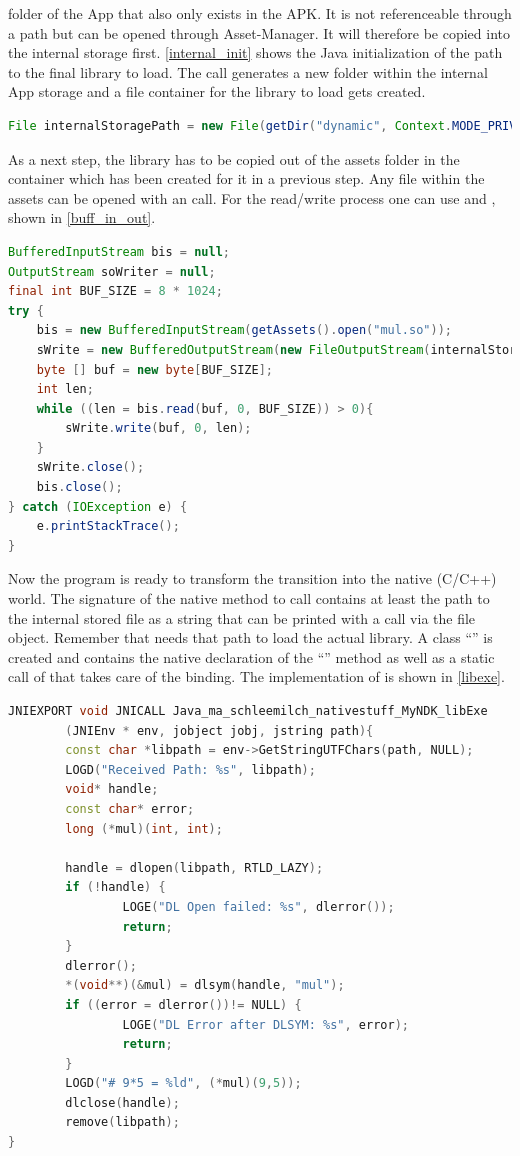  folder of the App that also only exists in the APK. It is not
referenceable through a path but can be opened through Asset-Manager. It will therefore be copied into the internal storage first. \autoref{internal_init} shows the Java initialization of the path to the final library to load. The  call generates a new folder within the internal App storage and a file container for the library to load gets created.
\begin{lstlisting}[language=Java, caption=Internal Storage Initialization, label=internal_init]
File internalStoragePath = new File(getDir("dynamic", Context.MODE_PRIVATE), "mul.so");
\end{lstlisting}
As a next step, the library has to be copied out of the assets folder in the container which has been created for it in a previous step. Any file within the assets can be opened with an
 call. For the read/write process one can use
 and , shown in
\autoref{buff_in_out}.
\begin{lstlisting}[language=Java, caption=Buffered Input/Output, label=buff_in_out]
BufferedInputStream bis = null;
OutputStream soWriter = null;
final int BUF_SIZE = 8 * 1024;
try {
    bis = new BufferedInputStream(getAssets().open("mul.so"));
    sWrite = new BufferedOutputStream(new FileOutputStream(internalStoragePath));
    byte [] buf = new byte[BUF_SIZE];
    int len;
    while ((len = bis.read(buf, 0, BUF_SIZE)) > 0){
        sWrite.write(buf, 0, len);
    }
    sWrite.close();
    bis.close();
} catch (IOException e) {
    e.printStackTrace();
}
\end{lstlisting}
Now the program is ready to transform the transition into the native (C/C++) world.
The signature of the native method to call contains at least the path to
the internal stored file as a string that can be printed with a  call via the
 file object. Remember that  needs that path to load the actual library.
A class ``'' is created and contains the native declaration of the
``'' method as well as a static call of
 that takes care of the binding.
The implementation of  is shown in \autoref{libexe}.
\begin{lstlisting}[language=C++, caption=Native libExe(), label=libexe]
JNIEXPORT void JNICALL Java_ma_schleemilch_nativestuff_MyNDK_libExe
        (JNIEnv * env, jobject jobj, jstring path){
        const char *libpath = env->GetStringUTFChars(path, NULL);
        LOGD("Received Path: %s", libpath);
        void* handle;
        const char* error;
        long (*mul)(int, int);

        handle = dlopen(libpath, RTLD_LAZY);
        if (!handle) {
                LOGE("DL Open failed: %s", dlerror());
                return;
        }
        dlerror();
        *(void**)(&mul) = dlsym(handle, "mul");
        if ((error = dlerror())!= NULL) {
                LOGE("DL Error after DLSYM: %s", error);
                return;
        }
        LOGD("# 9*5 = %ld", (*mul)(9,5));
        dlclose(handle);
        remove(libpath);
}
\end{lstlisting}
